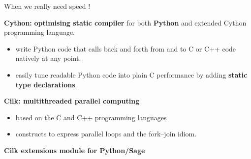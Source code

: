 \documentclass[compress,11pt]{beamer}
\begin{document}
\begin{frame}[fragile]{When we really need speed !}

  \textbf{Cython:} \textbf{optimising static compiler} for both
  \textbf{Python} and extended Cython programming language.

\begin{itemize}
\item write Python code that calls back and forth from and to C or C++ code
  natively at any point.
\item easily tune readable Python code into plain C performance by adding
  \textbf{static type declarations}.
\end{itemize}
\bigskip\pause

\textbf{Cilk: multithreaded parallel computing}
\begin{itemize}
\item based on the C and C++ programming languages
\item constructs to express parallel loops and the fork–join idiom.
\end{itemize}
\bigskip\pause

\centering \textbf{\Large\color{red}Cilk extensions module for Python/Sage}
\end{frame}
\end{document}
